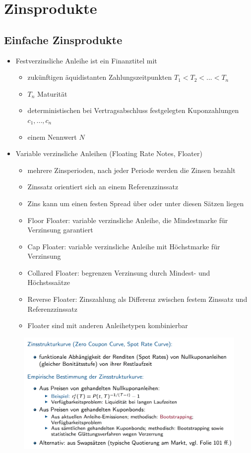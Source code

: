 \documentclass[12pt]{report}
\theoremstyle{dotless}
\theoremstyle{definition}
\begin{document}
\section{Zinsprodukte}

\subsection{Einfache Zinsprodukte}

\begin{itemize}
	\item Festverzinsliche Anleihe ist ein Finanztitel mit
	\begin{itemize}
		\item zuk\"unftigen \"aquidistanten Zahlungszeitpunkten $T_1 < T_2 < ...< T_n$
		\item $T_n$ Maturit\"at
		\item deterministischen bei Vertragsabschluss festgelegten Kuponzahlungen $c_1,...,c_n$
		\item einem Nennwert $N$
	\end{itemize}
	\item Variable verzinsliche Anleihen (Floating Rate Notes, Floater)
	\begin{itemize}
		\item mehrere Zinsperioden, nach jeder Periode werden die Zinsen bezahlt
		\item Zinssatz orientiert sich an einem Referenzzinssatz
		\item Zins kann um einen festen Spread \"uber oder unter diesen S\"atzen liegen
		\item Floor Floater: variable verzinsliche Anleihe, die Mindestmarke f\"ur Verzinsung garantiert
		\item Cap Floater: variable verzinsliche Anleihe mit H\"ochstmarke f\"ur Verzinsung
		\item Collared Floater: begrenzen Verzinsung durch Mindest- und H\"ochstssa\"atze
		\item Reverse Floater: Zinszahlung als Differenz zwischen festem Zinssatz und Referenzzinssatz
		\item Floater sind mit anderen Anleihetypen kombinierbar
	\end{itemize}
\end{itemize}


\begin{figure}[H]
\centering
\includegraphics[width=\textwidth]{Bilder/Zinsstrukturkurve.png}
\end{figure}
\end{document}
